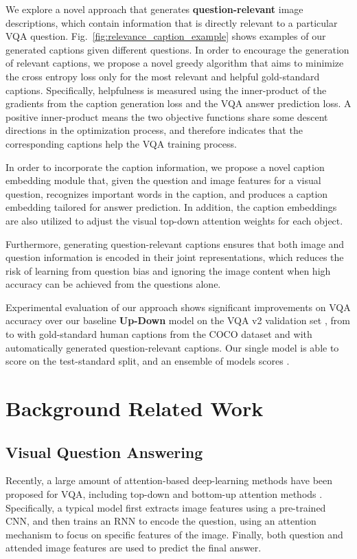 \documentclass[11pt,a4paper]{article}
\begin{document}
We explore a novel approach that generates \textbf{question-relevant} image descriptions, which contain information that is directly relevant to a particular VQA question. Fig.\ \ref{fig:relevance_caption_example} shows examples of our generated captions given different questions. In order to encourage the generation of relevant captions, we propose a novel greedy algorithm that aims to minimize the cross entropy loss only for the most relevant and helpful gold-standard captions. Specifically, helpfulness is measured using the inner-product of the gradients from the caption generation loss and the VQA answer prediction loss. A positive inner-product means the two objective functions share some descent directions in the optimization process, and therefore indicates that the corresponding captions help the VQA training process.  

In order to incorporate the caption information, we propose a novel caption embedding module that, given the question and image features for a visual question, recognizes important words in the caption, and produces a caption embedding tailored for answer prediction. In addition, the caption embeddings are also utilized to adjust the visual top-down attention weights for each object.

Furthermore, generating question-relevant captions ensures that both image and question information is encoded in their joint representations, which reduces the risk of learning from question bias \cite{li2018tell} and ignoring the image content when high accuracy can be achieved from the questions alone.
 
Experimental evaluation of our approach shows significant improvements on VQA accuracy over our baseline \textbf{Up-Down} \cite{anderson2017bottom} model on the VQA v2 validation set \cite{antol2015vqa}, from  to  with gold-standard human captions from the COCO dataset \cite{chen2015microsoft}  and  with automatically generated question-relevant captions. Our single model is able to score  on the test-standard split, and an ensemble of  models scores .

\section{Background Related Work}
\subsection{Visual Question Answering} 
Recently, a large amount of attention-based deep-learning methods have been proposed for VQA, including top-down \cite{ren2015exploring,fukui2016multimodal,wu2016action,goyal2017making,li2018tell} and bottom-up attention methods \cite{anderson2017bottom,li2018vqa,wu2018self}. Specifically, a typical model first extracts image features using a pre-trained CNN, and then trains an RNN to encode the question, using an attention mechanism to focus on specific features of the image. Finally, both question and attended image features are used to predict the final answer.
\end{document}
